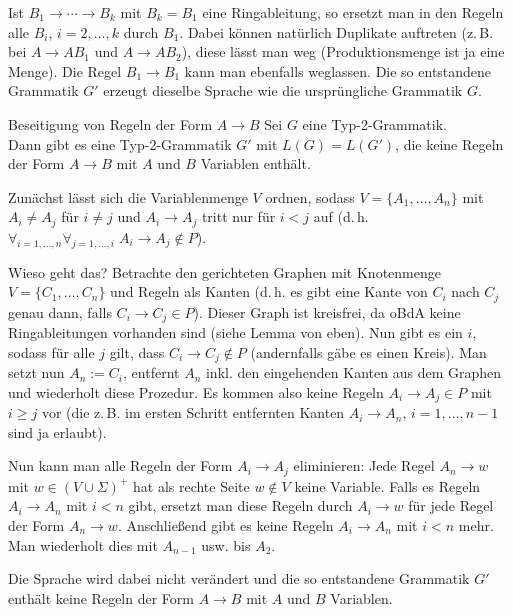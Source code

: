\begin{Beweis}
    Ist $B_1 \rightarrow \dotsb \rightarrow B_k$ mit $B_k = B_1$ eine
    Ringableitung, so ersetzt man in den Regeln
    alle $B_i$, $i = 2, \dotsc, k$ durch $B_1$.
    Dabei können natürlich Duplikate auftreten
    (z.\,B. bei $A \rightarrow AB_1$ und $A \rightarrow AB_2$),
    diese lässt man weg (Produktionsmenge ist ja eine Menge).
    Die Regel $B_1 \rightarrow B_1$ kann man ebenfalls weglassen.
    Die so entstandene Grammatik $G'$ erzeugt dieselbe Sprache wie die
    ursprüngliche Grammatik $G$.
\end{Beweis}

\begin{Lemma}{Beseitigung von Regeln der Form $A \rightarrow B$}
    Sei $G$ eine Typ-2-Grammatik.\\
    Dann gibt es eine Typ-2-Grammatik $G'$ mit $L(G) = L(G')$, die keine
    Regeln der Form $A \rightarrow B$ mit $A$ und $B$ Variablen enthält.
\end{Lemma}

\begin{Beweis}
    Zunächst lässt sich die Variablenmenge $V$ ordnen, sodass
    $V = \{A_1, \dotsc, A_n\}$ mit $A_i \not= A_j$ für $i \not= j$ und
    $A_i \rightarrow A_j$ tritt nur für $i < j$ auf
    (d.\,h. $\forall_{i=1,\dots,n} \forall_{j=1,\dotsc,i}\;
    A_i \rightarrow A_j \notin P$).
    
    Wieso geht das?
    Betrachte den gerichteten Graphen mit Knotenmenge
    $V = \{C_1, \dotsc, C_n\}$ und Regeln
    als Kanten (d.\,h. es gibt eine Kante von
    $C_i$ nach $C_j$ genau dann, falls $C_i \rightarrow C_j \in P$).
    Dieser Graph ist kreisfrei, da oBdA keine Ringableitungen vorhanden sind
    (siehe Lemma von eben).
    Nun gibt es ein $i$, sodass für alle $j$ gilt, dass
    $C_i \rightarrow C_j \notin P$
    (andernfalls gäbe es einen Kreis).
    Man setzt nun $A_n := C_i$, entfernt $A_n$ inkl. den eingehenden Kanten
    aus dem Graphen und wiederholt diese Prozedur.
    Es kommen also keine Regeln $A_i \rightarrow A_j \in P$ mit
    $i \ge j$ vor
    (die z.\,B. im ersten Schritt entfernten Kanten
    $A_i \rightarrow A_n$, $i = 1, \dotsc, n - 1$ sind ja erlaubt).
    
    Nun kann man alle Regeln der Form $A_i \rightarrow A_j$ eliminieren:
    Jede Regel $A_n \rightarrow w$ mit $w \in (V \cup \Sigma)^+$ hat als
    rechte Seite $w \notin V$ keine Variable.
    Falls es Regeln $A_i \rightarrow A_n$ mit $i < n$ gibt, ersetzt man diese
    Regeln durch $A_i \rightarrow w$ für jede Regel der Form
    $A_n \rightarrow w$.
    Anschließend gibt es keine Regeln $A_i \rightarrow A_n$ mit $i < n$ mehr.
    Man wiederholt dies mit $A_{n-1}$ usw. bis $A_2$.
    
    Die Sprache wird dabei nicht verändert und die so entstandene
    Grammatik $G'$ enthält keine Regeln der Form $A \rightarrow B$ mit
    $A$ und $B$ Variablen.
\end{Beweis}

